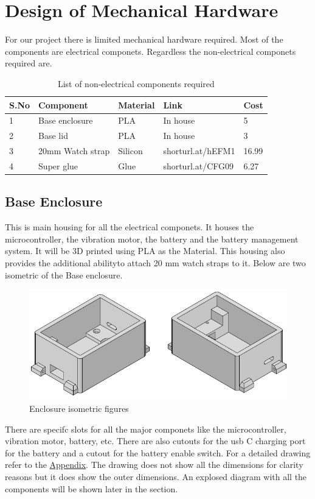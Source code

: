 \documentclass[12pt, titlepage]{article}
\begin{document}
\section{Design of Mechanical Hardware}
For our project there is limited mechanical hardware required. Most of the components are electrical componets. Regardless the non-electrical componets required are. 
\begin{table}[H]
\centering
\caption{List of non-electrical components required}
\begin{tabular}{lllll}
S.No & Component        & Material & Link              & Cost  \\ \hline
1    & Base enclosure   & PLA      & In house          & 5     \\
2    & Base lid         & PLA      & In house          & 3     \\
3    & 20mm Watch strap & Silicon  & shorturl.at/hEFM1 & 16.99 \\
4    & Super glue       & Glue     & shorturl.at/CFG09 & 6.27 
\end{tabular}
\label{tab:my-table}
\end{table}

\subsection{Base Enclosure}
This is main housing for all the electrical componets. It houses the microcontroller, the vibration motor, the battery and the battery management system. It will be 3D printed using PLA as the Material. This housing also provides the additional abilityto attach 20 mm watch straps to it.
Below are two isometric of the Base enclosure. 
\begin{figure}[H]
  \includegraphics[width=\textwidth,height=\textheight,keepaspectratio]{Base_ISO.png}
  \caption{Enclosure isometric figures}
  \label{EnclosureISO} 
\end{figure}
There are specifc slots for all the major componets like the microcontroller, vibration motor, battery, etc. There are also cutouts for the usb C charging port for the battery and a cutout for the battery enable switch. For a detailed drawing refer to the \hyperref[appendix:hardware:enclosureDWG]{Appendix}. The drawing does not show all the dimensions for clarity reasons but it does show the outer dimensions. An explosed diagram with all the components will be shown later in the section. 
 
\end{document}
